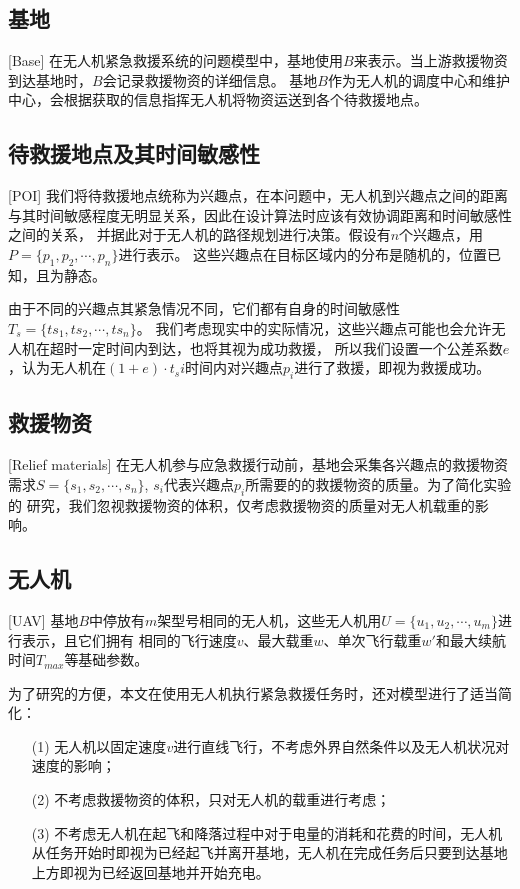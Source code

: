 \subsection{基地}[Base]
在无人机紧急救援系统的问题模型中，基地使用$B$来表示。当上游救援物资到达基地时，$B$会记录救援物资的详细信息。
基地$B$作为无人机的调度中心和维护中心，会根据获取的信息指挥无人机将物资运送到各个待救援地点。
\subsection{待救援地点及其时间敏感性}[POI]
我们将待救援地点统称为兴趣点，在本问题中，无人机到兴趣点之间的距离与其时间敏感程度无明显关系，因此在设计算法时应该有效协调距离和时间敏感性之间的关系，
并据此对于无人机的路径规划进行决策。假设有$n$个兴趣点，用$P=\lbrace p_1, p_2, \cdots ,p_n \rbrace$进行表示。
这些兴趣点在目标区域内的分布是随机的，位置已知，且为静态。


由于不同的兴趣点其紧急情况不同，它们都有自身的时间敏感性$T_s=\lbrace ts_1, ts_2, \cdots ,ts_n \rbrace$。
我们考虑现实中的实际情况，这些兴趣点可能也会允许无人机在超时一定时间内到达，也将其视为成功救援，
所以我们设置一个公差系数$e$，认为无人机在$(1+e) \cdot t_si$时间内对兴趣点$p_i$进行了救援，即视为救援成功。
\subsection{救援物资}[Relief materials]
在无人机参与应急救援行动前，基地会采集各兴趣点的救援物资需求$S=\lbrace s_1, s_2, \cdots ,s_n \rbrace$, $s_i$代表兴趣点$p_i$所需要的的救援物资的质量。为了简化实验的
研究，我们忽视救援物资的体积，仅考虑救援物资的质量对无人机载重的影响。
\subsection{无人机}[UAV]
基地$B$中停放有$m$架型号相同的无人机，这些无人机用$U=\lbrace u_1, u_2, \cdots ,u_m \rbrace$进行表示，且它们拥有
相同的飞行速度$v$、最大载重$w$、单次飞行载重$w \prime$和最大续航时间$T_{max}$等基础参数。


为了研究的方便，本文在使用无人机执行紧急救援任务时，还对模型进行了适当简化：
\begin{itemize}
	\item [(1)] 无人机以固定速度$v$进行直线飞行，不考虑外界自然条件以及无人机状况对速度的影响；
 	\item [(2)] 不考虑救援物资的体积，只对无人机的载重进行考虑；
  	\item [(3)] 不考虑无人机在起飞和降落过程中对于电量的消耗和花费的时间，无人机从任务开始时即视为已经起飞并离开基地，无人机在完成任务后只要到达基地上方即视为已经返回基地并开始充电。
\end{itemize}

